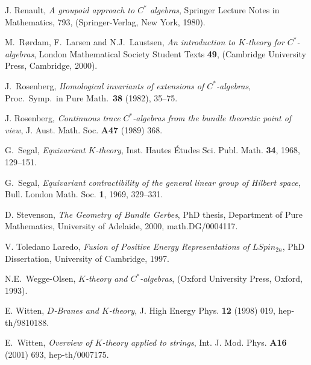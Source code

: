 \documentclass[a4paper,reqno]{amsart}
\theoremstyle{plain}
\theoremstyle{definition}
\theoremstyle{remark}
\numberwithin{equation}{section}
\numberwithin{figure}{section}
\newcommand{\<}{\langle}
\renewcommand{\>}{\rangle}
\begin{document}
\begin{thebibliography}{99}
J. Renault, {\em A groupoid approach to $C^*$ algebras},
Springer Lecture Notes in Mathematics, 793, (Springer-Verlag, New York,
1980).


M.~R\o rdam, F.~Larsen and N.J.~Laustsen, {\it An introduction
to $K$-theory for $C^*$-algebras},
London Mathematical Society Student Texts {\bf 49}, (Cambridge
University Press, Cambridge, 2000).


J.~Rosenberg, {\it Homological invariants of extensions of
$C^*$-algebras}, Proc.\ Symp.\ in Pure Math.\ {\bf 38} (1982), 35--75.


J. Rosenberg, {\it Continuous trace $C^*$-algebras from
the bundle theoretic point of view},
J. Aust. Math. Soc. {\bf A47} (1989) 368.

G.~Segal, {\it Equivariant ${K}$-theory},
Inst. Hautes \'Etudes Sci. Publ. Math.
{\bf 34}, 1968, 129--151.

G.~Segal,
{\it Equivariant contractibility of the general linear group of
               Hilbert space}, Bull. London Math. Soc.
   {\bf 1}, 1969, 329--331.

D. Stevenson,
{\it The Geometry of Bundle Gerbes},
PhD thesis, Department of Pure Mathematics, University of Adelaide, 2000,
math.DG/0004117.

V. Toledano Laredo, {\it Fusion of Positive Energy Representations 
of $LSpin_{2n}$}, PhD Dissertation, University of Cambridge, 1997. 

N.E.~Wegge-Olsen, {\it $K$-theory and $C^*$-algebras},
(Oxford University Press, Oxford, 1993).

E. Witten,
{\it $D$-Branes and $K$-theory},
J. High Energy Phys. {\bf 12} (1998) 019, hep-th/9810188.

E.~Witten,
{\it Overview of $K$-theory applied to strings},
Int. J. Mod. Phys. {\bf A16} (2001) 693, hep-th/0007175.

\end{thebibliography}
\end{document}
